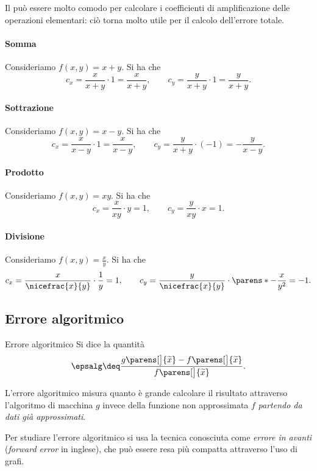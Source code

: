 Il  può essere molto comodo per calcolare i coefficienti di amplificazione delle operazioni elementari: ciò torna molto utile per il calcolo dell'errore totale.

\paragraph{Somma} Consideriamo $f(x, y) = x + y$. Si ha che \[
    c_x = \frac{x}{x+y}\cdot 1 = \frac{x}{x+y}, \qquad c_y = \frac{y}{x+y} \cdot 1 = \frac{y}{x+y}.
\] 
\paragraph{Sottrazione} Consideriamo $f(x, y) = x - y$. Si ha che \[
    c_x = \frac{x}{x-y}\cdot 1 = \frac{x}{x-y}, \qquad c_y = \frac{y}{x+y} \cdot (-1) = -\frac{y}{x-y}.
\] 
\paragraph{Prodotto} Consideriamo $f(x, y) = xy$. Si ha che \[
    c_x = \frac{x}{xy}\cdot y = 1, \qquad c_y = \frac{y}{xy} \cdot x = 1.
\] 
\paragraph{Divisione} Consideriamo $f(x, y) = \frac{x}{y}$. Si ha che \[
    c_x = \frac{x}{\nicefrac{x}{y}} \cdot \frac{1}{y} = 1, \qquad c_y = \frac{y}{\nicefrac{x}{y}} \cdot \parens*{-\frac{x}{y^2}} = -1.
\] 

\subsection{Errore algoritmico}

\begin{definition}{Errore algoritmico}{}
    Si dice  la quantità \[
        \epsalg \deq \frac{g\parens[\big]{\tilde x} - f\parens[\big]{\tilde x}}{f\parens[\big]{\tilde x}}.
    \]
\end{definition}

L'errore algoritmico misura quanto è grande calcolare il risultato attraverso l'algoritmo di macchina $g$ invece della funzione non approssimata $f$ \emph{partendo da dati già approssimati}.

Per studiare l'errore algoritmico si usa la tecnica conosciuta come \emph{errore in avanti} (\emph{forward error} in inglese), che può essere resa più compatta attraverso l'uso di grafi.

